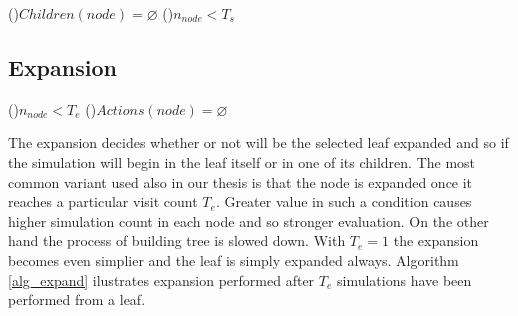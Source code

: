\begin{algorithm}
\DontPrintSemicolon
\caption{$UCTSelectionStep(node)$
\label{alg_selection_step}}
\If(){$Children(node)=\varnothing$}{
}
\If(){$n_{node} < T_s$}{
     
}
 
\end{algorithm}



\subsection{Expansion}
\label{sec_expansion}


\begin{algorithm}
\DontPrintSemicolon
\caption{$Expand(node)$\label{alg_expand}}
\If(){$n_{node} < T_e$}{
}
\If(){$Actions(node) = \varnothing$}{
}
\end{algorithm}

The expansion decides whether or not will be the selected leaf expanded and so if the simulation
will begin in the leaf itself or in one of its children. The most common variant used also in our
thesis is that the node is
expanded once it reaches a particular visit count $T_e$. Greater value in such a condition causes higher
simulation count in each node and so stronger evaluation. On the other hand the process of building
tree is slowed down. With $T_e=1$ the expansion becomes even simplier and the leaf is simply
expanded always. Algorithm \ref{alg_expand} ilustrates expansion performed after $T_e$
simulations have been performed from a leaf.


